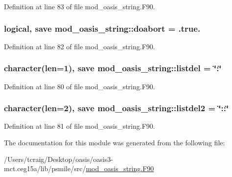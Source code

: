 Definition at line 83 of file mod\+\_\+oasis\+\_\+string.\+F90.

\hypertarget{classmod__oasis__string_a59e9b1145c7c14506941e6495b237395}{
\subsubsection[{doabort}]{\setlength{\rightskip}{0pt plus 5cm}logical, save mod\+\_\+oasis\+\_\+string\+::doabort = .true.\hspace{0.3cm}{\ttfamily [private]}}}\label{classmod__oasis__string_a59e9b1145c7c14506941e6495b237395}


Definition at line 82 of file mod\+\_\+oasis\+\_\+string.\+F90.

\hypertarget{classmod__oasis__string_aa6f905efb4869a52d8bb2414e82bb0a7}{
\subsubsection[{listdel}]{\setlength{\rightskip}{0pt plus 5cm}character(len=1), save mod\+\_\+oasis\+\_\+string\+::listdel = \char`\"{}\+:\char`\"{}\hspace{0.3cm}{\ttfamily [private]}}}\label{classmod__oasis__string_aa6f905efb4869a52d8bb2414e82bb0a7}


Definition at line 80 of file mod\+\_\+oasis\+\_\+string.\+F90.

\hypertarget{classmod__oasis__string_a9b40ad6f4785bd4765a24b6337185513}{
\subsubsection[{listdel2}]{\setlength{\rightskip}{0pt plus 5cm}character(len=2), save mod\+\_\+oasis\+\_\+string\+::listdel2 = \char`\"{}\+::\char`\"{}\hspace{0.3cm}{\ttfamily [private]}}}\label{classmod__oasis__string_a9b40ad6f4785bd4765a24b6337185513}


Definition at line 81 of file mod\+\_\+oasis\+\_\+string.\+F90.



The documentation for this module was generated from the following file\+:\begin{DoxyCompactItemize}
\item 
/\+Users/tcraig/\+Desktop/oasis/oasis3-\/mct.\+ceg15a/lib/psmile/src/\hyperlink{mod__oasis__string_8_f90}{mod\+\_\+oasis\+\_\+string.\+F90}\end{DoxyCompactItemize}
